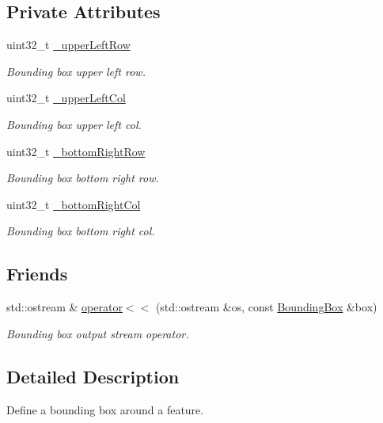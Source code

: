 \subsection*{Private Attributes}
\begin{DoxyCompactItemize}
\item 
uint32\+\_\+t \hyperlink{classfc_1_1BoundingBox_a9e75c4e7a1249bfd286d3c2cdb8bce84}{\+\_\+upper\+Left\+Row}
\begin{DoxyCompactList}\small\item\em Bounding box upper left row. \end{DoxyCompactList}\item 
uint32\+\_\+t \hyperlink{classfc_1_1BoundingBox_a5e384b0edc1e5ae8c264c74f317725ea}{\+\_\+upper\+Left\+Col}
\begin{DoxyCompactList}\small\item\em Bounding box upper left col. \end{DoxyCompactList}\item 
uint32\+\_\+t \hyperlink{classfc_1_1BoundingBox_a9797ed1e8272f512abd7b2c0598766e5}{\+\_\+bottom\+Right\+Row}
\begin{DoxyCompactList}\small\item\em Bounding box bottom right row. \end{DoxyCompactList}\item 
uint32\+\_\+t \hyperlink{classfc_1_1BoundingBox_a1ac6bfcd930956a8cf7e580b83e88147}{\+\_\+bottom\+Right\+Col}
\begin{DoxyCompactList}\small\item\em Bounding box bottom right col. \end{DoxyCompactList}\end{DoxyCompactItemize}
\subsection*{Friends}
\begin{DoxyCompactItemize}
\item 
std\+::ostream \& \hyperlink{classfc_1_1BoundingBox_a9b77edf50fd5d4a4bd03dda7eb3054fe}{operator$<$$<$} (std\+::ostream \&os, const \hyperlink{classfc_1_1BoundingBox}{Bounding\+Box} \&box)
\begin{DoxyCompactList}\small\item\em Bounding box output stream operator. \end{DoxyCompactList}\end{DoxyCompactItemize}


\subsection{Detailed Description}
Define a bounding box around a feature. 

